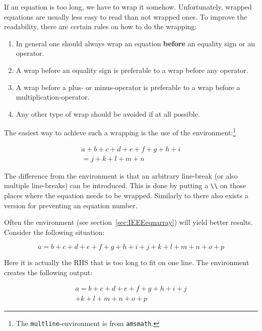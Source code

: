 If an equation is too long, we have to wrap it somehow. Unfortunately,
wrapped equations are usually less easy to read than not wrapped
ones. To improve the readability, there are certain rules on how to do
the wrapping:
\begin{enumerate}
\item In general one should always wrap an equation \textbf{before} an
  equality sign or an operator.
\item A wrap before an equality sign is preferable to a wrap before
  any operator.
\item A wrap before a plus- or minus-operator is preferable to a wrap
  before a multiplication-operator.
\item Any other type of wrap should be avoided if at all possible.
\end{enumerate}
The easiest way to achieve such a wrapping is the use of the
 en\-vi\-ron\-ment:\footnote{The
  \texttt{multline}-environment is from \texttt{amsmath}.}
\begin{example}
\begin{multline}
  a + b + c + d + e + f 
  + g + h + i  
  \\
  = j + k + l + m + n 
\end{multline}
\end{example}
\noindent
The difference from the  environment is that an arbitrary
line-break (or also multiple line-breaks) can be introduced. This is
done by putting a \verb+\\+ on those places where the equation needs
to be wrapped. Similarly to  there also exists a
 version for preventing an equation number.

Often the
 environment (see section~\ref{sec:IEEEeqnarray})
will yield better results.  Consider the following
situation:
\begin{example}
\begin{equation}
  a = b + c + d + e + f 
  + g + h + i + j 
  + k + l + m + n + o + p  
  \label{eq:equation_too_long}
\end{equation}
\end{example}
\noindent
Here it is actually the RHS that is too long to fit on one line. The
 environment creates the following output:
\begin{example}
\begin{multline}
  a = b + c + d + e + f 
  + g + h + i + j \\
  + k + l + m + n + o + p
\end{multline}
\end{example}

